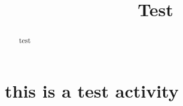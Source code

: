 \documentclass{ximera}
\title{Test}
\begin{document}
\begin{abstract}
test
\end{abstract}
\maketitle

\section{this is a test activity}
\end{document}
